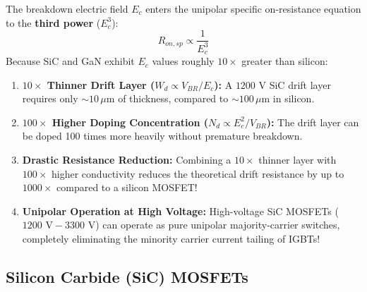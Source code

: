 \documentclass[11pt,a4paper]{article}
\begin{document}
\begin{conceptbox}
The breakdown electric field $E_c$ enters the unipolar specific on-resistance equation to the \textbf{third power} ($E_c^3$):
\begin{equation}
R_{on,sp} \propto \frac{1}{E_c^3}
\end{equation}
Because SiC and GaN exhibit $E_c$ values roughly $10\times$ greater than silicon:
\begin{enumerate}
  \item \textbf{$10\times$ Thinner Drift Layer ($W_d \propto V_{BR} / E_c$):} A $1200\text{ V}$ SiC drift layer requires only $\sim 10\,\mu\text{m}$ of thickness, compared to $\sim 100\,\mu\text{m}$ in silicon.
  \item \textbf{$100\times$ Higher Doping Concentration ($N_d \propto E_c^2 / V_{BR}$):} The drift layer can be doped 100 times more heavily without premature breakdown.
  \item \textbf{Drastic Resistance Reduction:} Combining a $10\times$ thinner layer with $100\times$ higher conductivity reduces the theoretical drift resistance by up to \textbf{$1000\times$} compared to a silicon MOSFET!
  \item \textbf{Unipolar Operation at High Voltage:} High-voltage SiC MOSFETs ($1200\text{ V} - 3300\text{ V}$) can operate as pure unipolar majority-carrier switches, completely eliminating the minority carrier current tailing of IGBTs!
\end{enumerate}
\end{conceptbox}

\subsection{Silicon Carbide (SiC) MOSFETs}
\end{document}
